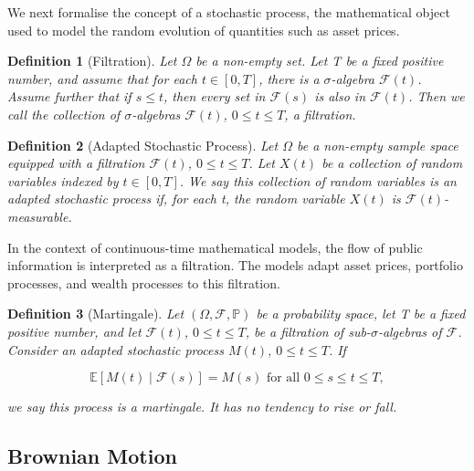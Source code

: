 \documentclass[11pt, a4paper]{article}
\newtheorem{definition}{Definition}
\numberwithin{equation}{subsection}
\numberwithin{definition}{subsection}
\numberwithin{theorem}{subsection}
\numberwithin{remark}{subsection}
\begin{document}
We next formalise the concept of a stochastic process, the mathematical object used to model the random evolution of quantities such as asset prices.

\begin{definition}[Filtration]
Let \(\Omega\) be a non-empty set. Let T be a fixed positive number, and assume that for each \(t \in [0, T]\), there is a \(\sigma\)-algebra \(\mathcal{F}(t)\). Assume further that if \(s \leq t\), then every set in \(\mathcal{F}(s)\) is also in \(\mathcal{F}(t)\). Then we call the collection of \(\sigma\)-algebras \(\mathcal{F}(t)\), \(0 \leq t \leq T\), a \textup{filtration}.
\end{definition}

\begin{definition}[Adapted Stochastic Process]
Let \(\Omega\) be a non-empty sample space equipped with a filtration \(\mathcal{F}(t)\), \(0 \leq t \leq T\). Let \(X(t)\) be a collection of random variables indexed by \(t \in [0, T]\). We say this collection of random variables is an \textup{adapted stochastic process} if, for each t, the random variable \(X(t)\) is \(\mathcal{F}(t)\)-measurable.
\end{definition}

In the context of continuous-time mathematical models, the flow of public information is interpreted as a filtration. The models adapt asset prices, portfolio processes, and wealth processes to this filtration.

\begin{definition}[Martingale]
Let \((\Omega, \mathcal{F},\mathbb{P})\) be a probability space, let T be a fixed positive number, and let \(\mathcal{F}(t)\), \(0 \leq t \leq T\), be a filtration of sub-\(\sigma\)-algebras of \(\mathcal{F}\). Consider an adapted stochastic process \(M(t)\), \(0 \leq t \leq T\). If
    
    \[
    \mathbb{E}[M(t) \mid \mathcal{F}(s)] = M(s) \text{ for all } 0 \leq s \leq t \leq T,
    \]

we say this process is a \textup{martingale}. It has no tendency to rise or fall.

\end{definition}

\subsection{Brownian Motion}
\end{document}
